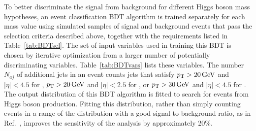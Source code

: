 \documentclass[12pt,twoside,a4paper,cmspaper,final,collab]{cms-tdr}
\begin{document}
To better discriminate the signal from background for
different Higgs boson mass hypotheses, an event classification BDT algorithm is trained separately for
each mass value using simulated samples of signal and background events
that pass the  selection criteria described above, together with the requirements listed in Table~\ref{tab:BDTsel}.
The set of input
variables used in training this BDT is chosen by iterative optimization from a larger number of
potentially discriminating variables. Table~\ref{tab:BDTvars}
lists these variables. The number $N_{aj}$ of additional jets in an
event counts jets that satisfy
$p_{\mathrm{T}}>20\,\text{Ge\hspace{-.08em}V}$ and $\left | \eta \right | < 4.5$
for \WlnH,   $p_{\mathrm{T}}>20\,\text{Ge\hspace{-.08em}V}$ and $\left | \eta \right | < 2.5$
for \ZllH, or  $p_{\mathrm{T}}>30\,\text{Ge\hspace{-.08em}V}$ and $\left | \eta \right | < 4.5$
for \ZnnH.
The output distribution of this BDT algorithm is fitted to search for
events from Higgs boson production. Fitting this distribution,
rather than simply counting events in a range of the distribution with
a good signal-to-background ratio, as in Ref.~\cite{VHbb_PLB}, improves the sensitivity
of the analysis by approximately 20\%.
\end{document}
